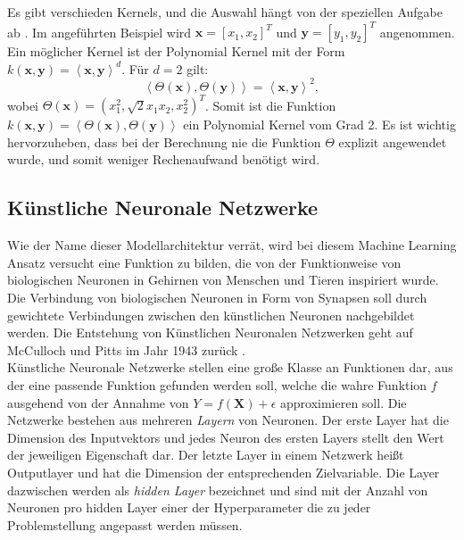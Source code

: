 Es gibt verschieden Kernels, und die Auswahl h\"angt von der speziellen Aufgabe ab \cite{SVM1}. Im angef\"uhrten Beispiel wird $ \mathbf{x} = [x_1, x_2]^T$ und $\mathbf{y} = [y_1, y_2]^T$ angenommen.
Ein m\"oglicher Kernel ist der Polynomial Kernel mit der Form
$k(\mathbf{x}, \mathbf{y}) = \left\langle \mathbf{x}, \mathbf{y} \right\rangle^d$. F\"ur $d=2$ gilt:
$$ \left\langle \Theta(\mathbf{x}), \Theta(\mathbf{y}) \right\rangle = \left\langle \mathbf{x}, \mathbf{y} \right\rangle^2, $$
wobei $\Theta(\mathbf{x}) = (x_1^2, \sqrt{2}x_1x_2, x_2^2)^T$.
Somit ist die Funktion $k(\mathbf{x}, \mathbf{y}) = \left\langle \Theta(\mathbf{x}), \Theta(\mathbf{y}) \right\rangle$
ein Polynomial Kernel vom Grad 2. Es ist wichtig hervorzuheben, dass bei der Berechnung nie die Funktion $\Theta$ explizit angewendet wurde,
und somit weniger Rechenaufwand ben\"otigt wird. \\































\subsection{K\"unstliche Neuronale Netzwerke}
Wie der Name dieser Modellarchitektur verr\"at, wird bei diesem Machine Learning Ansatz versucht eine Funktion zu bilden, die von der Funktionweise
von biologischen Neuronen in Gehirnen von Menschen und Tieren inspiriert wurde. Die Verbindung von biologischen Neuronen in Form von Synapsen soll durch gewichtete
Verbindungen zwischen den k\"unstlichen Neuronen nachgebildet werden. Die Entstehung von K\"unstlichen Neuronalen Netzwerken
geht auf McCulloch und Pitts im Jahr 1943 zur\"uck \cite{McCulloch}. \\

K\"unstliche Neuronale Netzwerke stellen eine gro{\ss}e Klasse an Funktionen dar, aus der eine passende Funktion gefunden werden soll, welche
die wahre Funktion $f$ ausgehend von der Annahme von $Y = f(\mathbf{X}) + \epsilon$ approximieren soll. Die Netzwerke bestehen aus mehreren \textit{Layern} von Neuronen. Der erste Layer hat
die Dimension des Inputvektors und jedes Neuron des ersten Layers stellt den Wert der jeweiligen Eigenschaft dar. Der letzte Layer in einem Netzwerk hei{\ss}t
Outputlayer und hat die Dimension der entsprechenden Zielvariable. Die Layer dazwischen werden als \textit{hidden Layer} bezeichnet und sind mit der Anzahl von Neuronen pro
hidden Layer einer der Hyperparameter die zu jeder Problemstellung angepasst werden m\"ussen. \\

